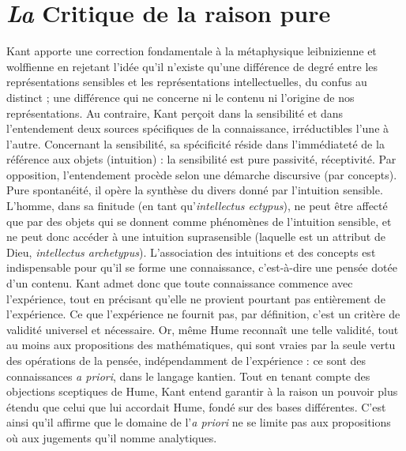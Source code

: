 
\section{{\it La} Critique de la raison pure}

Kant apporte une correction fondamentale
à la métaphysique leibnizienne et
wolffienne en rejetant l’idée qu’il n’existe
qu'une différence de degré entre les
représentations sensibles et les représentations
intellectuelles, du confus au distinct ;
une différence qui ne concerne ni
le contenu ni l’origine de nos représentations.
Au contraire, Kant perçoit dans la
sensibilité et dans l’entendement deux
sources spécifiques de la connaissance,
irréductibles l’une à l’autre. Concernant
la sensibilité, sa spécificité réside dans
l’immédiateté de la référence aux objets
(intuition) : la sensibilité est pure passivité,
réceptivité. Par opposition, l’entendement
procède selon une démarche
discursive (par concepts). Pure spontanéité,
il opère la synthèse du divers donné
par l'intuition sensible. L'homme, dans sa
finitude (en tant qu’{\it intellectus ectypus}), ne
peut être affecté que par des objets qui se
donnent comme phénomènes de l’intuition
sensible, et ne peut donc accéder à
une intuition suprasensible (laquelle est
un attribut de Dieu, {\it intellectus archetypus}).
L'association des intuitions et des
concepts est indispensable pour qu’il se
forme une connaissance, c’est-à-dire une
pensée dotée d’un contenu. Kant admet
donc que toute connaissance commence
avec l’expérience, tout en précisant
qu’elle ne provient pourtant pas entièrement
de l’expérience. Ce que l'expérience
ne fournit pas, par définition, c’est un critère
de validité universel et nécessaire.
Or, même Hume reconnaît une telle validité,
tout au moins aux propositions des
mathématiques, qui sont vraies par la
seule vertu des opérations de la pensée,
indépendamment de l'expérience : ce sont
des connaissances {\it a priori}, dans le langage
kantien. Tout en tenant compte des objections
sceptiques de Hume, Kant entend
garantir à la raison un pouvoir plus
étendu que celui que lui accordait Hume,
fondé sur des bases différentes. C’est ainsi
qu'il affirme que le domaine de l’{\it a priori}
ne se limite pas aux propositions où aux
jugements qu’il nomme analytiques.

